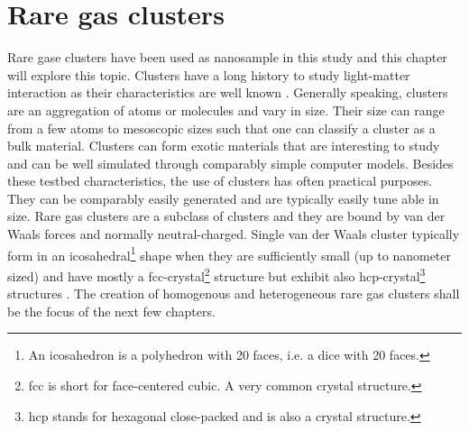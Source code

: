 \section{Rare gas clusters}\label{sec:cluster-theory}
Rare gase clusters have been used as nanosample in this study and this chapter will explore this topic. Clusters have a long history to study light-matter interaction as their characteristics are well known \cite{Haberland-1994-Springer}. Generally speaking, clusters are an aggregation of atoms or molecules and vary in size. Their size can range from a few atoms to mesoscopic sizes such that one can classify a cluster as a bulk material. Clusters can form exotic materials that are interesting to study and can be well simulated through comparably simple computer models. Besides these testbed characteristics, the use of clusters has often practical purposes. They can be comparably easily generated and are typically easily tune able in size. Rare gas clusters are a subclass of clusters and they are bound by van der Waals forces and normally neutral-charged. Single van der Waals cluster typically form in an icosahedral\footnote{An icosahedron is a polyhedron with 20 faces, i.e. a dice with 20 faces.} shape when they are sufficiently small (up to nanometer sized) \cite{Miehle-1989-JCP} and have mostly a fcc-crystal\footnote{fcc is short for face-centered cubic. A very common crystal structure.} structure but exhibit also hcp-crystal\footnote{hcp stands for hexagonal close-packed and is also a crystal structure.} structures \cite{VanDeWaal-1993-JCP,Krainyukova-2006-TSF}. The creation of homogenous and heterogeneous rare gas clusters shall be the focus of the next few chapters.
